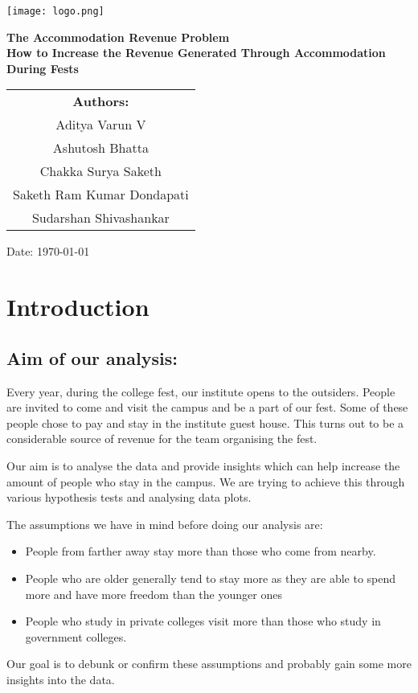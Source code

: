 \documentclass[oneside]{book}
\begin{document}
\begin{titlepage}
    \centering
    \begin{center}
    \texttt{[image: logo.png]} %
    \end{center}
    \vspace{1cm}
    \Huge
    \textbf{The Accommodation Revenue Problem}\\
    \vspace{0.5cm}
    \LARGE
    \textbf{How to Increase the Revenue Generated Through Accommodation During Fests}\\
    \vspace{1cm}
    \large
    \begin{tabular}{c}
        \textbf{Authors:} \\
        Aditya Varun V \\
        Ashutosh Bhatta\\
        Chakka Surya Saketh\\
        Saketh Ram Kumar Dondapati\\
        Sudarshan Shivashankar
    \end{tabular}
    \vfill
    \large
    Date: \today %
    \vspace{1cm}
    
\end{titlepage}
\tableofcontents
\clearpage
\chapter{Introduction}
\section{Aim of our analysis:}

\large Every year, during the college fest, our institute opens to the outsiders. People are invited to come and visit the campus and be a part of our fest. Some of these people chose to pay and stay in the institute guest house. This turns out to be a considerable source of revenue for the team organising the fest. 

Our aim is to analyse the data and provide insights which can help increase the amount of people who stay in the campus. We are trying to achieve this through various hypothesis tests and analysing data plots. 

The assumptions we have in mind before doing our analysis are:
\begin{itemize}
    \item People from farther away stay more than those who come from nearby.
    \item People who are older generally tend to stay more as they are able to spend more and have more freedom than the younger ones
    \item People who study in private colleges visit more than those who study in government colleges.
\end{itemize}
Our goal is to debunk or confirm these assumptions and probably gain some more insights into the data.
\end{document}
